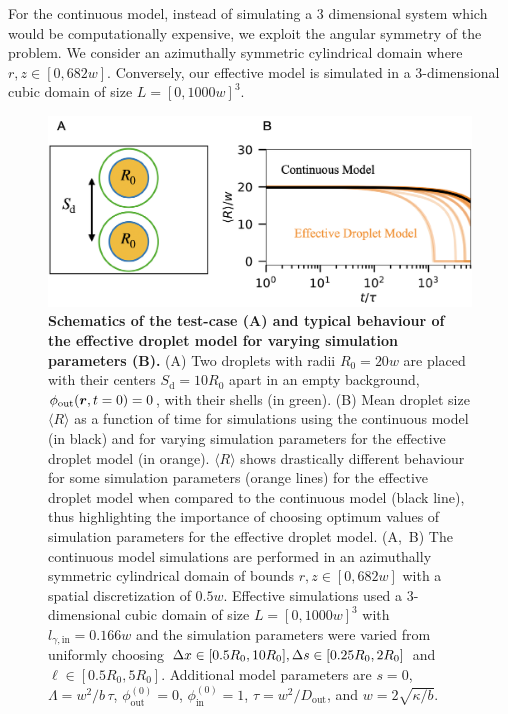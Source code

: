 For the continuous model, instead of simulating a 3 dimensional system which would be computationally expensive, we exploit the angular symmetry of the problem.
We consider an azimuthally symmetric cylindrical domain where $r,z \in [0, 682 w]$.
Conversely, our effective model is simulated in a $3$-dimensional cubic domain of size $L = [0, 1000 w]^{3}$.

\begin{figure}[tb]
\centering
\includegraphics[scale=0.5]{MainContent/Figures/droplet_pair_schematic.pdf}
\caption{
\textbf{Schematics of the test-case (A) and typical behaviour of the effective droplet model for varying simulation parameters (B).}
(A) Two droplets with radii $R_0 = 20 w$ are placed with their centers $S_\mathrm{d} = 10 R_0$ apart in an empty background, $\phi_\mathrm{out}(\boldsymbol{r}, t=0) = 0$, with their shells (in green).
(B) Mean droplet size $\langle R \rangle$ as a function of time for simulations using the continuous model (in black) and for varying simulation parameters for the effective droplet model (in orange).
$\langle R \rangle$ shows drastically different behaviour for some simulation parameters (orange lines) for the effective droplet model when compared to the continuous model (black line), thus highlighting the importance of choosing optimum values of simulation parameters for the effective droplet model.  
\mbox{(A, B)}
The continuous model simulations are performed in an azimuthally symmetric cylindrical domain of bounds $r,z \in [0, 682 w]$ with a spatial discretization of $0.5w$.
Effective simulations used a $3$-dimensional cubic domain of size $L = [0, 1000 w]^3$ with $l_{\gamma, \mathrm{in}} = 0.166 w$ and the simulation parameters were varied from uniformly choosing $\Delta x \in [0.5R_0, 10R_0], \Delta s \in [0.25R_0, 2R_0]$ and $\ell \in [0.5R_0, 5R_0]$.
Additional model parameters are $s=0$, $\Lambda = w^2 / b \, \tau$, $\phi^{(0)}_\mathrm{out} = 0$, $\phi^{(0)}_\mathrm{in} = 1$, $\tau = w^2/D_\mathrm{out}$, and $w = 2 \sqrt{\kappa / b}$.
}
\label{fig:droplet_pair_schematics}
\end{figure}


